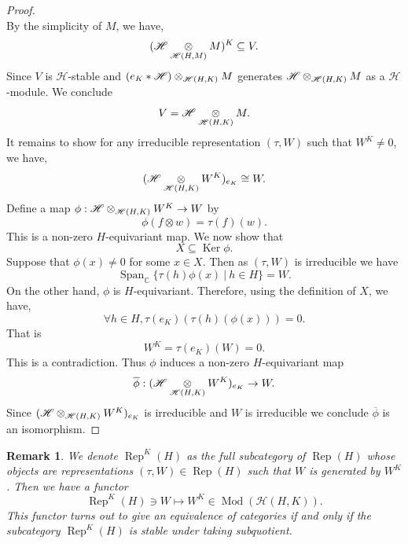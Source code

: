 \documentclass[8pt]{article}
\newtheorem{remark}{Remark}[section]
\DeclareMathOperator{\Rep}{Rep}
\DeclareMathOperator{\Ker}{Ker}
\DeclareMathOperator{\Mod}{Mod}
\DeclareMathOperator{\Span}{Span}
\newcommand{\C}[0]{\mathbb{C}}
\newcommand{\sep}[0]{\:|\:}
\newcommand{\hecke}[0]{\mathscr{H}}
\newcommand{\tens}[1]{%
  \mathbin{\mathop{\otimes}\displaylimits_{#1}}%
}
\begin{document}
\begin{proof}
\begin{equation*}
  \end{equation*}
  By the simplicity of $M$, we have, 
  \begin{equation*}
    (\hecke\tens{\hecke(H,M)}M)^K\subseteq V.
  \end{equation*}
  Since $V$ is $\hecke$-stable and $(e_K\ast\hecke)\tens{\hecke(H,K)}M$ generates $\hecke\tens{\hecke(H,K)}M$ as a $\hecke$-module. We conclude 
  \begin{equation*}
    V = \hecke\tens{\hecke(H,K)}M.
  \end{equation*}
  It remains to show for any irreducible representation $(\tau,W)$ such that $W^K\not=0$, we have,
  \begin{equation*}
    (\hecke\tens{\hecke(H,K)}W^K)_{e_K} \cong W.
  \end{equation*}
  Define a map $\phi:\hecke\tens{\hecke(H,K)}W^K\to W$ by 
  \begin{equation*}
  \phi(f\otimes w) = \tau(f)(w).
  \end{equation*}
  This is a non-zero $H$-equivariant map. We now show that 
  \begin{equation*}
  X\subseteq \Ker\phi.
  \end{equation*}
  Suppose that $\phi(x)\not=0$ for some $x\in X$. Then as $(\tau,W)$ is irreducible we have 
  \begin{equation*}
    \Span_\C\{\tau(h)\phi(x)\sep h\in H\}=W.
  \end{equation*}
  On the other hand, $\phi$ is $H$-equivariant. Therefore, using the definition of $X$, we have,
  \begin{equation*}
    \forall h\in H,\tau(e_K)(\tau(h)(\phi(x))) = 0.
  \end{equation*}
  That is 
  \begin{equation*}
    W^K = \tau(e_K)(W) = 0.
  \end{equation*}
  This is a contradiction. Thus $\phi$ induces a non-zero $H$-equivariant map 
  \begin{equation*}
  \overline{\phi}:(\hecke\tens{\hecke(H,K)}W^K)_{e_K}\to W.
  \end{equation*}
  Since $(\hecke\tens{\hecke(H,K)}W^K)_{e_K}$ is irreducible and $W$ is irreducible we conclude $\overline{\phi}$ is an isomorphism.
\end{proof}

\begin{remark}
  We denote $\Rep^K(H)$ as the full subcategory of $\Rep(H)$ whose objects are representations $(\tau,W)\in\Rep(H)$ such that $W$ is generated by $W^K$.
  Then we have a functor 
  \begin{equation*}
    \Rep^K(H)\ni W\mapsto W^K\in\Mod(\hecke(H,K)).
  \end{equation*}
  This functor turns out to give an equivalence of categories if and only if the subcategory $\Rep^K(H)$ is stable under taking subquotient.
\end{remark}
\end{document}
